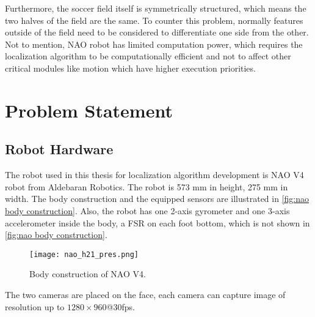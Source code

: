 Furthermore, the soccer field itself is symmetrically structured, which means the two halves of the field are the same. To counter this problem, normally features outside of the field need to be considered to differentiate one side from the other.
Not to mention,  NAO robot has limited computation power, which requires the localization algorithm to be computationally efficient and not to affect other critical modules like motion which have higher execution priorities.




\section{Problem Statement}
\subsection{Robot Hardware}\label{sub:hardware}
The robot used in this thesis for localization algorithm development is NAO V4 robot from Aldebaran Robotics. The robot is 573 mm in height, 275 mm in width. The body construction and the equipped sensors are illustrated in \autoref{fig:nao body construction}. Also, the robot has one 2-axis gyrometer and one 3-axis accelerometer inside the body, a \gls{FSR} on each foot bottom, which is not shown in \autoref{fig:nao body construction}.

\begin{figure}[h!]
  \centering
  \texttt{[image: nao\_h21\_pres.png]}
  \caption[Body construction of NAO V4.]{Body construction of NAO V4. \cite{NAOBody}}
  \label{fig:nao body construction}
\end{figure}


The two cameras are placed on the face, each camera can capture image of resolution up to $1280 \times 960$@30fps. %


